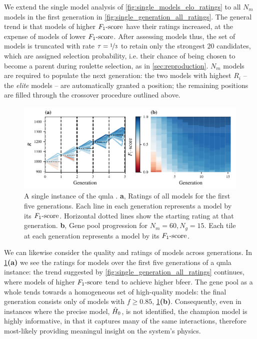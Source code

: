 We extend the single model analysis of \cref{fig:single_models_elo_ratings} to all $N_m$ models 
    in the first generation in \cref{fig:single_generation_all_ratings}.
The general trend is that models of higher $ F_{1}\text{-score} $ have their ratings increased, 
    at the expense of models of lower $ F_{1}\text{-score} $. 
After assessing models thus, the set of models is truncated with rate $\tau=\nicefrac{1}{3}$ to retain only 
    the strongest $20$ candidates,
    which are assigned selection probability, i.e. their chance of being chosen to become a parent during roulette selection, 
    as in \cref{sec:reproduction}.
$N_m$ models are required to populate the next generation:
    the two models with highest $R_i$ -- the \emph{elite} models -- are automatically granted a position;
    the remaining positions are filled through the crossover procedure outlined above.

\par 
\begin{figure}
    \begin{center}
        \includegraphics{theoretical_study/figures/gen_alg_instance_combined.pdf}
    \end{center}
    \caption[\Gls{instance} of \gls{qmla} ]{
        A single \gls{instance} of the \gls{qmla} .
        \textbf{a}, Ratings of all models for the first five generations. 
        Each line in each generation represents a model by its $ F_{1}\text{-score} $. 
        Horizontal dotted lines show the starting rating at that generation. 
        \textbf{b}, Gene pool progression for $N_m=60, N_g=15$. 
        Each tile at each generation represents a model by its $ F_{1}\text{-score} $. 
        \figtableref
    }
    \label{fig:ga_instance}
\end{figure}

We can likewise consider the quality and ratings of models across generations.
In \cref{fig:ga_instance}\textbf{(a)} we see the ratings for models over the first five generations of a \gls{qmla} \gls{instance}:
    the trend suggested by \cref{fig:single_generation_all_ratings} continues,
    where models of higher $ F_{1}\text{-score} $ tend to achieve higher \gls{bfeer}.
The gene pool as a whole tends towards a homogeneous set of high-quality models:
    the final generation consists only of models with $f \geq 0.85$, \cref{fig:ga_instance}\textbf{(b)}. 
Consequently, even in \glspl{instance} where the precise model, $\hat{H}_0$, is not identified, the \gls{champion model}
    is highly informative, in that it captures many of the same interactions, 
    therefore most-likely providing meaningul insight on the system's physics. 

